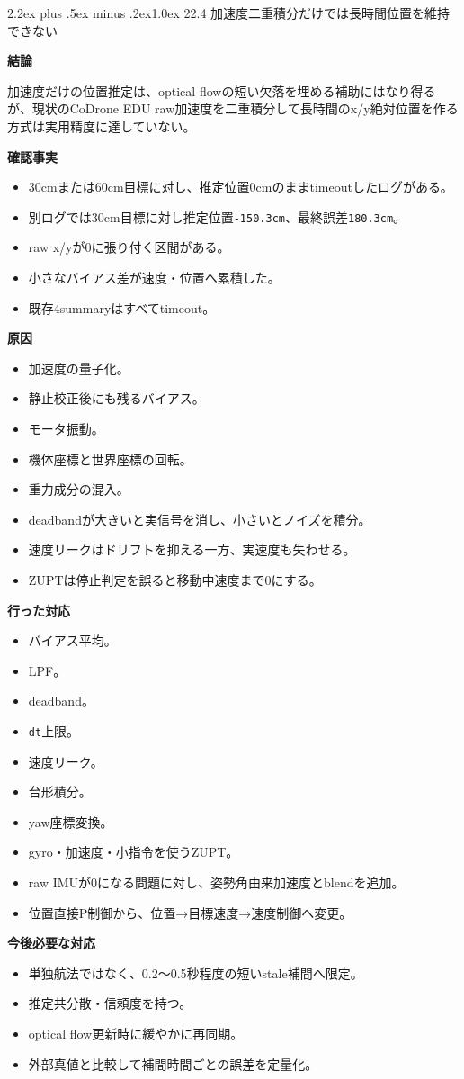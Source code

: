 \documentclass[10pt,a4paper,openany]{ltjsbook}
\makeatletter
\renewcommand\section{\@startsection{section}{1}{0pt}%
  {2.2ex plus .5ex minus .2ex}{1.0ex}%
  {\sffamily\Large\bfseries\color{ReportNavy}}}
\newcommand{\reportlabel}[1]{%
  \par\vspace{0.55em}%
  \noindent\colorbox{ReportTeal}{%
    \parbox{\dimexpr\linewidth-2\fboxsep\relax}{%
      \sffamily\bfseries\color{white}#1%
    }%
  }\par\vspace{0.20em}%
}
\makeatother
\begin{document}
\section{22.4 加速度二重積分だけでは長時間位置を維持できない}
\reportlabel{結論}
加速度だけの位置推定は、optical flowの短い欠落を埋める補助にはなり得るが、現状のCoDrone EDU raw加速度を二重積分して長時間のx/y絶対位置を作る方式は実用精度に達していない。\par
\reportlabel{確認事実}
\begin{itemize}
\item 30cmまたは60cm目標に対し、推定位置0cmのままtimeoutしたログがある。
\item 別ログでは30cm目標に対し推定位置\texttt{-150.3cm}、最終誤差\texttt{180.3cm}。
\item raw x/yが0に張り付く区間がある。
\item 小さなバイアス差が速度・位置へ累積した。
\item 既存4summaryはすべてtimeout。
\end{itemize}
\reportlabel{原因}
\begin{itemize}
\item 加速度の量子化。
\item 静止校正後にも残るバイアス。
\item モータ振動。
\item 機体座標と世界座標の回転。
\item 重力成分の混入。
\item deadbandが大きいと実信号を消し、小さいとノイズを積分。
\item 速度リークはドリフトを抑える一方、実速度も失わせる。
\item ZUPTは停止判定を誤ると移動中速度まで0にする。
\end{itemize}
\reportlabel{行った対応}
\begin{itemize}
\item バイアス平均。
\item LPF。
\item deadband。
\item \texttt{dt}上限。
\item 速度リーク。
\item 台形積分。
\item yaw座標変換。
\item gyro・加速度・小指令を使うZUPT。
\item raw IMUが0になる問題に対し、姿勢角由来加速度とblendを追加。
\item 位置直接P制御から、位置→目標速度→速度制御へ変更。
\end{itemize}
\reportlabel{今後必要な対応}
\begin{itemize}
\item 単独航法ではなく、0.2〜0.5秒程度の短いstale補間へ限定。
\item 推定共分散・信頼度を持つ。
\item optical flow更新時に緩やかに再同期。
\item 外部真値と比較して補間時間ごとの誤差を定量化。
\end{itemize}
\end{document}
